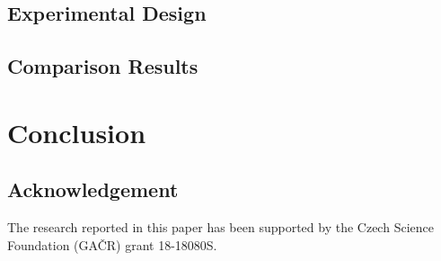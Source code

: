 \subsection{Experimental Design}


\subsection{Comparison Results}


\section{Conclusion}


\subsection*{Acknowledgement}

The research reported in this paper has been supported by the Czech Science Foundation (GAČR) grant 18-18080S.

\printbibliography

